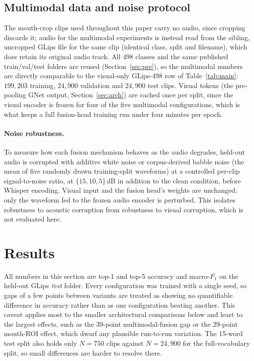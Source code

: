 \documentclass[10pt, a4paper]{article}
\begin{document}
\subsection{Multimodal data and noise protocol}
\label{sec:mm-data}
\noindent The mouth-crop clips used throughout this paper carry no audio, since cropping discards it; audio for the multimodal experiments is instead read from the sibling, uncropped GLips file for the same clip (identical class, split and filename), which does retain its original audio track. All $498$ classes and the same published train/val/test folders are reused (Section~\ref{sec:pre}), so the multimodal numbers are directly comparable to the visual-only GLips-498 row of Table~\ref{tab:main}: $199{,}203$ training, $24{,}900$ validation and $24{,}900$ test clips. Visual tokens (the pre-pooling GNet output, Section~\ref{sec:arch}) are cached once per split, since the visual encoder is frozen for four of the five multimodal configurations, which is what keeps a full fusion-head training run under four minutes per epoch.
\paragraph{Noise robustness.} To measure how each fusion mechanism behaves as the audio degrades, held-out audio is corrupted with additive white noise or corpus-derived babble noise (the mean of five randomly drawn training-split waveforms) at a controlled per-clip signal-to-noise ratio, at $\{15, 10, 5\}\,$dB in addition to the clean condition, before Whisper encoding. Visual input and the fusion head's weights are unchanged; only the waveform fed to the frozen audio encoder is perturbed. This isolates robustness to acoustic corruption from robustness to visual corruption, which is not evaluated here.
\section{Results}
\label{sec:results}
\noindent All numbers in this section are top-1 and top-5 accuracy and macro-$F_1$ on the held-out GLips \emph{test} folder. Every configuration was trained with a single seed, so gaps of a few points between variants are treated as showing no quantifiable difference in accuracy rather than as one configuration beating another. This caveat applies most to the smaller architectural comparisons below and least to the largest effects, such as the $39$-point multimodal-fusion gap or the $29$-point mouth-ROI effect, which dwarf any plausible run-to-run variation. The 15-word test split also holds only $N=750$ clips against $N=24{,}900$ for the full-vocabulary split, so small differences are harder to resolve there.
\end{document}
